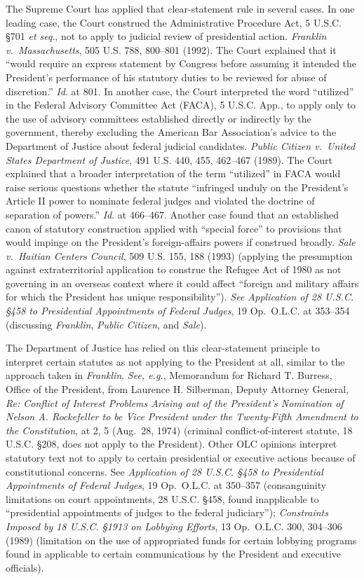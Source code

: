 The Supreme Court has applied that clear-statement rule in several cases.
In one leading case, the Court construed the Administrative Procedure Act, 5 U.S.C. \S 701 \textit{et seq}., not to apply to judicial review of presidential action.
\textit{Franklin v.\ Massachusetts}, 505 U.S. 788, 800--801 (1992).
The Court explained that it “would require an express statement by Congress before assuming it intended the President’s performance of his statutory duties to be reviewed for abuse of discretion.”
\textit{Id}. at 801.
In another case, the Court interpreted the word “utilized” in the Federal Advisory Committee Act (FACA), 5 U.S.C. App., to apply only to the use of advisory committees established directly or indirectly by the government, thereby excluding the American Bar Association’s advice to the Department of Justice about federal judicial candidates.
\textit{Public Citizen v.\ United States Department of Justice}, 491 U.S. 440, 455, 462--467 (1989).
The Court explained that a broader interpretation of the term “utilized” in FACA would raise serious questions whether the statute “infringed unduly on the President’s Article II power to nominate federal judges and violated the doctrine of separation of powers.”
\textit{Id}. at 466--467.
Another case found that an established canon of statutory construction applied with “special force” to provisions that would impinge on the President’s foreign-affairs powers if construed broadly.
\textit{Sale v.\ Haitian Centers Council}, 509 U.S. 155, 188 (1993) (applying the presumption against extraterritorial application to construe the Refugee Act of 1980 as not governing in an overseas context where it could affect “foreign and military affairs for which the President has unique responsibility”).
\textit{See Application of 28 U.S.C. \S 458 to Presidential Appointments of Federal Judges}, 19 Op.\ O.L.C. at 353--354 (discussing \textit{Franklin}, \textit{Public Citizen}, and \textit{Sale}).

The Department of Justice has relied on this clear-statement principle to interpret certain statutes as not applying to the President at all, similar to the approach taken in \textit{Franklin}.
\textit{See, e.g.}, Memorandum for Richard T. Burress, Office of the President, from Laurence H. Silberman, Deputy Attorney General, \textit{Re: Conflict of Interest Problems Arising out of the President's Nomination of Nelson A. Rockefeller to be Vice President under the Twenty-Fifth Amendment to the Constitution}, at 2, 5 (Aug.~28, 1974) (criminal conflict-of-interest statute, 18 U.S.C. \S 208, does not apply to the President).
Other OLC opinions interpret statutory text not to apply to certain presidential or executive actions because of constitutional concerns.
See \textit{Application of 28 U.S.C. \S 458 to Presidential Appointments of Federal Judges}, 19 Op.\ O.L.C. at 350--357 (consanguinity limitations on court appointments, 28 U.S.C. \S 458, found inapplicable to “presidential appointments of judges to the federal judiciary”);
\textit{Constraints Imposed by 18 U.S.C. \S 1913 on Lobbying Efforts}, 13 Op.\ O.L.C. 300, 304--306 (1989) (limitation on the use of appropriated funds for certain lobbying programs found in applicable to certain communications by the President and executive officials).


